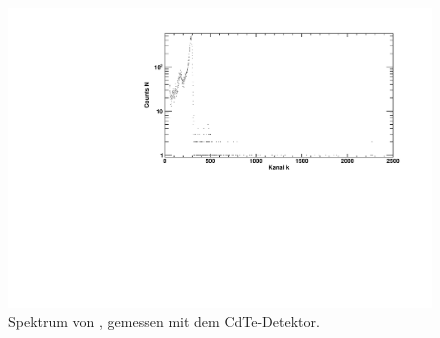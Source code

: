 \begin{figure}[H]
\begin{center}
  \includegraphics[width=\textwidth]{../img/part3/Am-CdTe_spectrum.pdf}
  \caption{Spektrum von \am, gemessen mit dem CdTe-Detektor.}
  \label{img:cdte:am:spektrum}
\end{center}
\end{figure}


